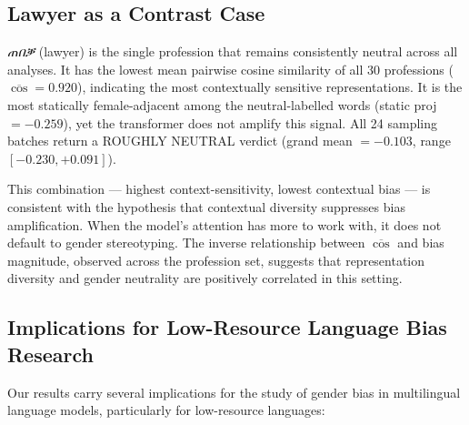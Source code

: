 \subsection{Lawyer as a Contrast Case}

\textit{ጠበቓ} (lawyer) is the single profession that remains consistently
neutral across all analyses. It has the lowest mean pairwise cosine similarity
of all 30 professions ($\overline{\cos} = 0.920$), indicating the most
contextually sensitive representations. It is the most statically female-adjacent
among the neutral-labelled words (static proj $= -0.259$), yet the transformer
does not amplify this signal. All 24 sampling batches return a ROUGHLY NEUTRAL
verdict (grand mean $= -0.103$, range $[-0.230, +0.091]$).

This combination — highest context-sensitivity, lowest contextual bias — is
consistent with the hypothesis that contextual diversity suppresses bias
amplification. When the model's attention has more to work with, it does not
default to gender stereotyping. The inverse relationship between
$\overline{\cos}$ and bias magnitude, observed across the profession set,
suggests that representation diversity and gender neutrality are positively
correlated in this setting.

\subsection{Implications for Low-Resource Language Bias Research}

Our results carry several implications for the study of gender bias in
multilingual language models, particularly for low-resource languages:

